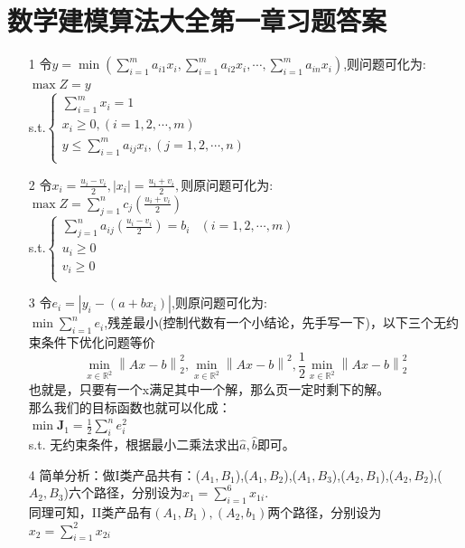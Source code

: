 \documentclass[a4paper,20pt]{article}
\begin{document}
\section{数学建模算法大全第一章习题答案}
\begin{itemize}
    \item[1] 令$y=\min(\sum_{i=1}^{m}a_{i1}x_i,\sum_{i=1}^{m}a_{i2}x_i,\cdots,\sum_{i=1}^{m}a_{in}x_i)$,则问题可化为:
    \\$\max Z=y$ 
    \\s.t.$ \left\{\begin{matrix}
        \sum_{i=1}^{m}x_i=1\\
        x_i\geq 0,(i=1,2,\cdots,m)\\
        y \leq \sum_{i=1}^{m}a_{ij}x_i,(j=1,2,\cdots,n)\\
    \end{matrix}\right.$
    \item[2] 令$x_i=\frac{u_i-v_i}{2},|x_i|=\frac{u_i+v_i}{2},$则原问题可化为:
    \\$\max Z=\sum_{j=1}^{n}c_{j}(\frac{u_i+v_i}{2})$
    \\s.t.$\left\{
        \begin{matrix}
            \sum_{j=1}^{n}a_{ij}(\frac{u_i-v_i}{2})=b_i&(i=1,2,\cdots,m)\\
            u_i\geq 0\\
            v_i\geq 0\\
        \end{matrix}
    \right.$
        \item[3] 令$e_i=|y_i-(a+bx_i)|$,则原问题可化为:
        \\ $\min\sum_{i=1}^{n}e_i$,残差最小(控制代数有一个小结论，先手写一下)，以下三个无约束条件下优化问题等价$$ \min\limits_{x\in\mathbb{R}^2}{\left\lVert Ax-b\right\rVert}_2^2,\min\limits_{x\in\mathbb{R}^2}{\left\lVert Ax-b\right\rVert}^2,\frac{1}{2}\min\limits_{x\in\mathbb{R}^2}{\left\lVert Ax-b\right\rVert}_2^2  $$也就是，只要有一个x满足其中一个解，那么页一定时剩下的解。
        \\那么我们的目标函数也就可以化成：
        \\$\min \mathbf{J}_1=\frac{1}{2}\sum_{i}^{n}e_i^2$
        \\s.t. 无约束条件，根据最小二乘法求出$\hat{a} ,\hat{b}$即可。
        \item[4] 简单分析：做I类产品共有：($A_1,B_1$),($A_1,B_2$),($A_1,B_3$),($A_2,B_1$),($A_2,B_2$),($A_2,B_3$)六个路径，分别设为$x_1=\sum_{i=1}^{6}x_{1i}$.
        \\同理可知，II类产品有$(A_1,B_1),(A_2,b_1)$两个路径，分别设为$x_2=\sum_{i=1}^{2}x_{2i}$

\end{itemize}
\end{document}
